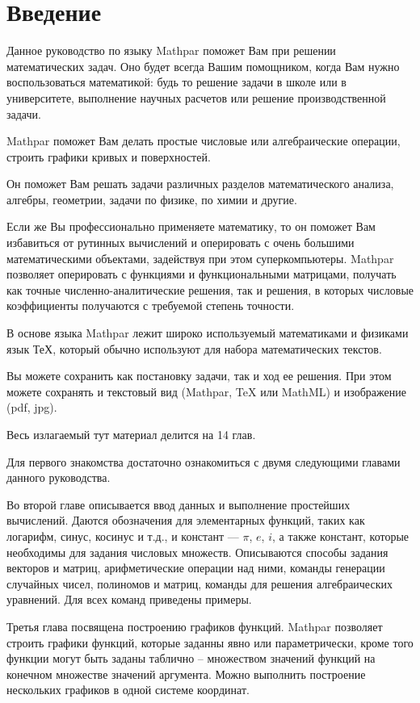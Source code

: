 \chapter{Введение}
Данное руководство по языку Mathpar поможет Вам при решении математических задач. 
Оно будет всегда Вашим помощником, когда Вам нужно воспользоваться математикой:
будь то решение задачи в школе или в университете, выполнение научных расчетов или решение производственной задачи.

Mathpar поможет Вам делать простые числовые или алгебраические операции, строить графики кривых и поверхностей.

Он поможет Вам решать задачи различных разделов математического анализа, алгебры, геометрии, задачи по физике, по химии и другие.  

Если же Вы профессионально применяете математику, то он поможет Вам избавиться от рутинных вычислений и оперировать с очень большими математическими объектами, задействуя при этом суперкомпьютеры. 
Mathpar позволяет оперировать с функциями и функциональными матрицами, получать как точные численно-аналитические решения, так и решения, в которых числовые коэффициенты получаются с требуемой степень точности.

В основе языка Mathpar лежит широко используемый математиками  и физиками язык ТеХ, который обычно используют для набора математических текстов.

Вы можете сохранить как постановку задачи, так и ход ее решения. При этом можете сохранять и текстовый вид (Mathpar, TeX или MathML) и изображение (pdf, jpg).

Весь излагаемый тут материал делится на 14 глав.

Для первого знакомства достаточно ознакомиться с двумя следующими главами данного руководства. 

Во второй главе описывается ввод данных и выполнение простейших вычислений. 
Даются обозначения для элементарных функций, таких как логарифм, синус, косинус и т.д., 
и констант --- $\pi$, $e$, $i$, а также констант, которые необходимы для задания числовых множеств. 
Описываются способы задания векторов и матриц, арифметические операции над ними, команды генерации случайных чисел, полиномов и матриц, команды для решения алгебраических уравнений. 
Для всех команд приведены примеры.

Третья глава посвящена построению графиков функций. Mathpar позволяет строить графики функций, которые заданны явно или параметрически,
кроме того функции могут быть заданы таблично -- множеством значений функций на конечном множестве значений аргумента. 
Можно выполнить построение нескольких графиков в одной системе координат. 

